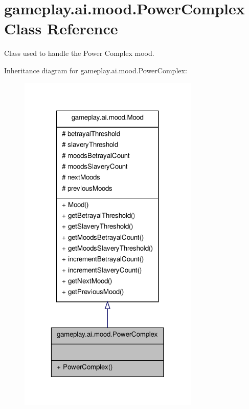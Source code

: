 \hypertarget{a00020}{\section{gameplay.\-ai.\-mood.\-Power\-Complex Class Reference}
\label{a00020}
}


Class used to handle the Power Complex mood.  




Inheritance diagram for gameplay.\-ai.\-mood.\-Power\-Complex\-:
\nopagebreak
\begin{figure}[H]
\begin{center}
\leavevmode
\includegraphics[width=244pt]{a00115}
\end{center}
\end{figure}


